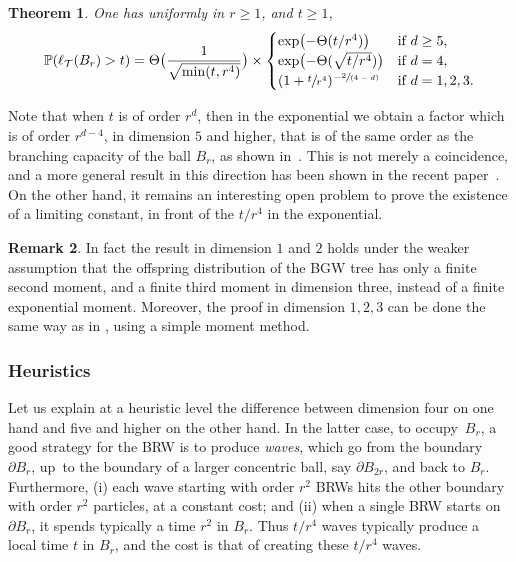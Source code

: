 \documentclass[11pt]{article}
\numberwithin{equation}{section}
\newcommand{\spfrac}[2]{\sfrac{#1}{(#2)}}
\theoremstyle{plain}
\newtheorem{theorem}{Theorem}[section]
\theoremstyle{definition}
\newtheorem{remark}[theorem]{Remark}
\newcommand\T{\mathcal{T}}
\newcommand{\1}{{\text{\Large $\mathfrak 1$}}}
\begin{document}
\begin{theorem} \label{theo.main}
One has uniformly in $r\ge 1$, and $t\ge 1$,
\begin{equation*}%
\mathbb P(\ell_{\T}(B_r) > t) =
\Theta\bigl(\frac{1}{\sqrt{\min(t,r^4)}}\bigr) \times
\begin{cases}
\exp \bigl(-\Theta(t/r^4)\bigr) & \text{if }d\ge 5, \\
\exp\bigl(- \Theta(\sqrt{ t/r^4})\bigr) & \text{if }d=4,\\
(1+\sfrac t{r^4})^{-\spfrac{2}{4-d}} & \text{if }d=1,2,3.
\end{cases}
\end{equation*}
\end{theorem}


Note that when $t$ is of order $r^d$, then in the exponential we obtain a factor which is of order $r^{d-4}$, in dimension $5$ and higher, that is of the same order as the branching capacity of the ball $B_r$, as shown in~\cite{Zhu1}.
This is not merely a coincidence, and a more general result in this direction has been shown in the recent paper~\cite{ASS23}.
On the other hand, it remains an interesting open problem to prove the existence of a limiting constant, in front of the $t/r^4$ in the exponential.

\begin{remark}
In fact the result in dimension $1$ and $2$ holds under the weaker assumption that the offspring distribution of the BGW tree has only a finite second moment, and a finite third moment in dimension three, instead of a finite exponential moment. Moreover, the proof in dimension $1,2,3$ can be done the same way as in \cite{AHJ}, using a simple moment method.
\end{remark}

\subsubsection*{Heuristics}
Let us explain at a heuristic level the difference between
dimension four on one hand and five and higher on the other hand.
In the latter case, to occupy~$B_r$, a good strategy for the BRW is to produce
\emph{waves}, which go from the boundary~$\partial B_r$,
up~to the boundary of a larger concentric ball,
say $\partial B_{2r}$, and back to $B_r$.
Furthermore, (i) each wave starting with order $r^2$ BRWs
hits the other boundary with order $r^2$ particles, at a constant cost; and
(ii) when a single BRW starts on $\partial B_r$,
it spends typically a time $r^2$ in $B_r$.
Thus $t/r^4$ waves typically produce a local time $t$ in $B_r$, and
the cost is that of creating these $t/r^4$ waves.
\end{document}
